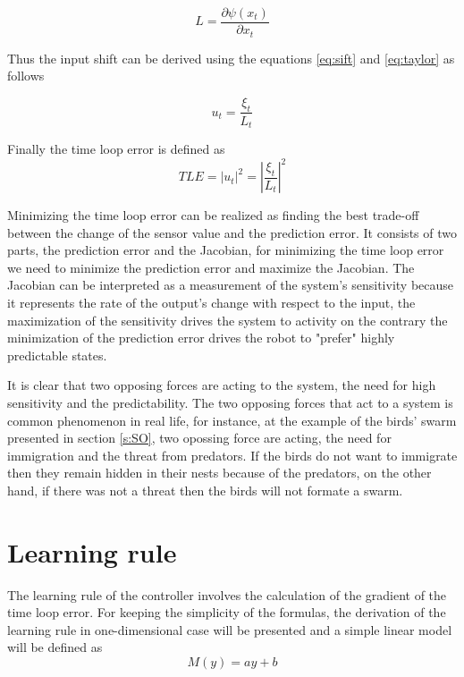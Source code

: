 \documentclass[msc,ai,logo]{infthesis}
\begin{document}
\[L = \frac{{\partial \psi ({x_t})}}{{\partial {x_t}}}\]

Thus the input shift can be derived using the equations \ref{eq:sift} and \ref{eq:taylor} as follows 

\begin{equation}
{u_t} = \frac{{{\xi _t}}}{{{L_t}}}
\end{equation}

Finally the time loop error is defined as 
\begin{equation}
TLE=\left|{u_t}\right|^2 = {\left| {\frac{{{\xi _t}}}{{{L_t}}}} \right|^2}
\label{eq:tle}
\end{equation}

Minimizing the time loop error can be realized as finding the best trade-off between the change of the sensor value and the prediction error. It consists of two parts, the prediction error and the Jacobian, for minimizing the time loop error we need to minimize the prediction error and maximize the Jacobian.
 The Jacobian can be interpreted as a measurement of the system's sensitivity because it represents the rate of the output's change with respect to the input, the maximization of the sensitivity drives the system to activity on the contrary the minimization of the prediction error drives the robot to "prefer" highly predictable states.
 
 It is clear that two opposing forces are acting to the system, the need for high sensitivity and the predictability. The two opposing forces that act to a system is common phenomenon in real life, for instance, at the example of the birds' swarm presented in section \ref{s:SO}, two opossing force are acting, the need for immigration and the threat from predators. If the birds do not want to immigrate then they remain hidden in their nests because of the predators, on the other hand, if there was not a threat then the birds will not formate a swarm.   
\label{sec:tle}
\section{Learning rule}

The learning rule of the controller involves the calculation of the gradient of the time loop error. For keeping the simplicity of the formulas, the derivation of the learning rule in one-dimensional case will be presented and a simple linear model will be defined as 
\begin{equation}
M(y)=ay+b
\label{eq:model}
\end{equation}
\end{document}
